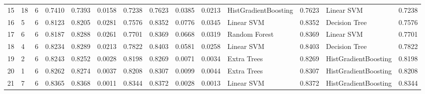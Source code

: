 \begin{tabular}{llllllllllllll}
15 & 18 & 6 & 0.7410 & 0.7393 & 0.0158 & 0.7238 & 0.7623 & 0.0385 & 0.0213 & HistGradientBoosting & 0.7623 & Linear SVM & 0.7238 \\
16 & 5 & 6 & 0.8123 & 0.8205 & 0.0281 & 0.7576 & 0.8352 & 0.0776 & 0.0345 & Linear SVM & 0.8352 & Decision Tree & 0.7576 \\
17 & 6 & 6 & 0.8187 & 0.8288 & 0.0261 & 0.7701 & 0.8369 & 0.0668 & 0.0319 & Random Forest & 0.8369 & Linear SVM & 0.7701 \\
18 & 4 & 6 & 0.8234 & 0.8289 & 0.0213 & 0.7822 & 0.8403 & 0.0581 & 0.0258 & Linear SVM & 0.8403 & Decision Tree & 0.7822 \\
19 & 2 & 6 & 0.8243 & 0.8252 & 0.0028 & 0.8198 & 0.8269 & 0.0071 & 0.0034 & Extra Trees & 0.8269 & HistGradientBoosting & 0.8198 \\
20 & 1 & 6 & 0.8262 & 0.8274 & 0.0037 & 0.8208 & 0.8307 & 0.0099 & 0.0044 & Extra Trees & 0.8307 & HistGradientBoosting & 0.8208 \\
21 & 7 & 6 & 0.8365 & 0.8368 & 0.0011 & 0.8344 & 0.8372 & 0.0028 & 0.0013 & Linear SVM & 0.8372 & HistGradientBoosting & 0.8344 \\
\bottomrule
\end{tabular}
